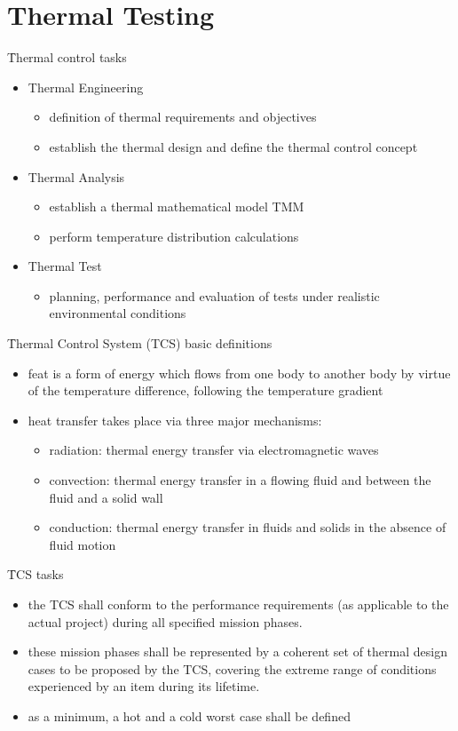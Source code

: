 \section{Thermal Testing}
\f{Thermal control tasks}
\begin{itemize}
\item Thermal Engineering
\begin{itemize}
 \item definition of thermal requirements and objectives
 \item establish the thermal design and define the thermal control concept
\end{itemize}
 \item Thermal Analysis
\begin{itemize}
 \item establish a thermal mathematical model TMM
 \item perform temperature distribution calculations
\end{itemize}
 \item Thermal Test
 \begin{itemize}
  \item planning, performance and evaluation of tests under realistic environmental conditions
 \end{itemize}
\end{itemize}

\f{Thermal Control System (TCS) basic definitions}
\begin{itemize}
 \item feat is a form of energy which flows from one body to another body by virtue of the temperature difference, following the temperature gradient
 \item heat transfer takes place via three major mechanisms:
\begin{itemize}
\item radiation: thermal energy transfer via electromagnetic waves
\item convection: thermal energy transfer in a flowing fluid and between the fluid and a solid wall
\item conduction: thermal energy transfer in fluids and solids in the absence of fluid motion
\end{itemize}
\end{itemize}

\f{TCS tasks}
\begin{itemize}
\item the TCS shall conform to the performance requirements (as applicable to the actual project) during all specified mission phases.
\item these mission phases shall be represented by a coherent set of thermal design cases to be proposed by the TCS, covering the extreme range of conditions experienced by an item 
during its lifetime.
\item as a minimum, a hot and a cold worst case shall be defined
\end{itemize}

